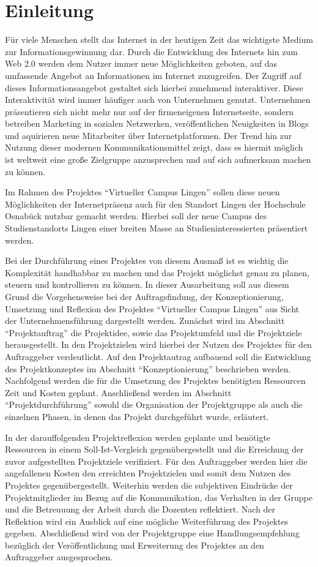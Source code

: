 \section{Einleitung}
\label{sec:Einleitung}
Für viele Menschen stellt das Internet in der heutigen Zeit das wichtigste
Medium zur Informationsgewinnung dar. Durch die Entwicklung des Internets hin
zum Web 2.0 werden dem Nutzer immer neue Möglichkeiten geboten, auf das
umfassende Angebot an Informationen im Internet zuzugreifen. Der Zugriff auf
dieses Informationsangebot gestaltet sich hierbei zunehmend interaktiver.
Diese Interaktivität wird immer häufiger auch von Unternehmen genutzt.
Unternehmen präsentieren sich nicht mehr nur auf der firmeneigenen
Internetseite, sondern betreiben Marketing in sozialen Netzwerken,
veröffentlichen Neuigkeiten in Blogs und aquirieren neue Mitarbeiter über
Internetplatformen. Der Trend hin zur Nutzung dieser modernen
Kommunikationsmittel zeigt, dass es hiermit möglich ist weltweit eine große
Zielgruppe anzusprechen und auf sich aufmerksam machen zu können.

Im Rahmen des Projektes "`Virtueller Campus Lingen"' sollen diese neuen
Möglichkeiten der Internetpräsenz auch für den Standort Lingen der Hochschule
Osnabück nutzbar gemacht werden. Hierbei soll der neue Campus des
Studienstandorts Lingen einer breiten Masse an Studieninteressierten
präsentiert werden.

Bei der Durchführung eines Projektes von diesem Ausmaß ist es wichtig die
Komplexität handhabbar zu machen und das Projekt möglichst genau zu planen,
steuern und kontrollieren zu können. In dieser Ausarbeitung soll aus diesem
Grund die Vorgehensweise bei der Auftragsfindung, der Konzeptionierung,
Umsetzung und Reflexion des Projektes "`Virtueller Campus Lingen"' aus Sicht der
Unternehmensführung dargestellt werden. Zunächst wird im Abschnitt
"`Projektauftrag"' die Projektidee, sowie das Projektumfeld und die Projektziele
herausgestellt. In den Projektzielen wird hierbei der Nutzen des Projektes
für den Auftraggeber verdeutlicht. Auf den Projektautrag aufbauend soll
die Entwicklung des Projektkonzeptes im Abschnitt "`Konzeptionierung"'
beschrieben werden. Nachfolgend werden die für die Umsetzung des Projektes
benötigten Ressourcen Zeit und Kosten geplant. Anschließend werden im Abschnitt
"`Projektdurchführung"' sowohl die Organisation der Projektgruppe als auch die
einzelnen Phasen, in denen das Projekt durchgeführt wurde, erläutert.  

In der darauffolgenden Projektreflexion werden geplante und benötigte Ressourcen
in einem Soll-Ist-Vergleich gegenübergestellt und die Erreichung der zuvor
aufgestellten Projektziele verifiziert. Für den Auftraggeber werden hier die
angefallenen Kosten den erreichten Projektzielen und somit dem Nutzen des
Projektes gegenübergestellt. Weiterhin werden die subjektiven Eindrücke der
Projektmitglieder im Bezug auf die Kommunikation, das Verhalten in der Gruppe
und die Betreuuung der Arbeit durch die Dozenten reflektiert. Nach der
Reflektion wird ein Ausblick auf eine mögliche Weiterführung des Projektes
gegeben. Abschließend wird von der Projektgruppe eine Handlungsempfehlung
bezüglich der Veröffentlichung und Erweiterung des Projektes an den Auftraggeber
ausgesprochen.